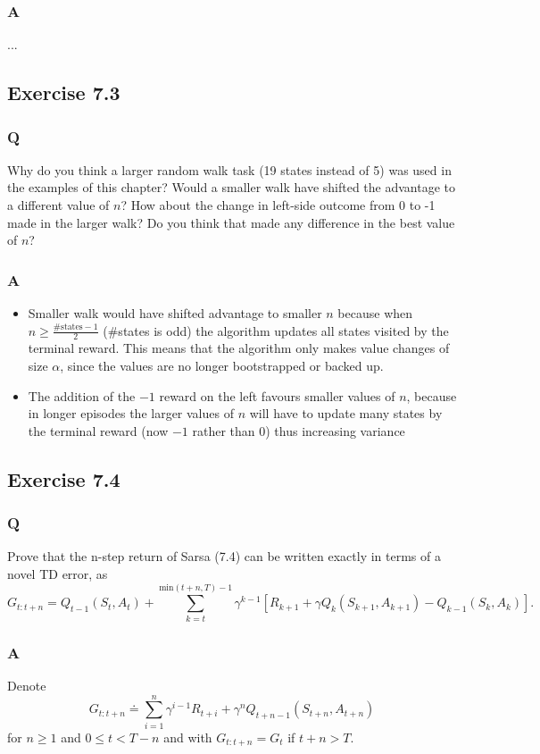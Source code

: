 \subsubsection*{A}
...

\subsection{Exercise 7.3}
\subsubsection*{Q}
Why do you think a larger random walk task (19 states instead of 5) was used in the examples of this chapter? Would a smaller walk have shifted the advantage to a different value of $n$? How about the change in left-side outcome from 0 to -1 made in the larger walk? Do you think that made any difference in the best value of $n$?
\subsubsection*{A}
\begin{itemize}
    \item Smaller walk would have shifted advantage to smaller $n$ because when $n \geq \frac{\textrm{\#states}-1}{2}$ (\#states is odd) the algorithm updates all states visited by the terminal reward. This means that the algorithm only makes value changes of size $\alpha$, since the values are no longer bootstrapped or backed up.
    \item The addition of the $-1$ reward on the left favours smaller values of $n$, because in longer episodes the larger values of $n$ will have to update many states by the terminal reward (now $-1$ rather than $0$) thus increasing variance
\end{itemize}

\subsection{Exercise 7.4}
\subsubsection*{Q}
Prove that the n-step return of Sarsa (7.4) can be written exactly in terms of a novel TD error, as
\[
    G_{t:t+n} = Q_{t-1}(S_t, A_t) + \sum_{k=t}^{\textrm{min}(t+n, T) -1} \gamma^{k-1}[R_{k+1} + \gamma Q_k(S_{k+1}, A_{k+1}) - Q_{k-1}(S_k, A_k)].
\]
\subsubsection*{A}
Denote
\[
    G_{t:t+n} \doteq \sum_{i=1}^n \gamma^{i-1}R_{t+i} + \gamma^n Q_{t+n-1}(S_{t+n}, A_{t+n})
\]
for $n \geq 1$ and $0 \leq t < T-n$ and with $G_{t:t+n} = G_t$ if $t+n > T$.\\

